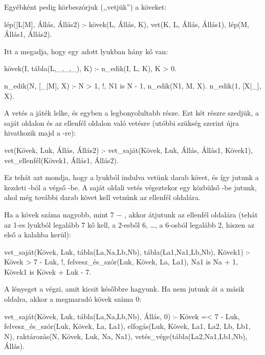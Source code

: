 Egyébként pedig körbeszórjuk (,,vetjük'') a köveket:
\begin{program}
lép([L|M], Állás, Állás2) :-
    kövek(L, Állás, K),
    vet(K, L, Állás, Állás1),
    lép(M, Állás1, Állás2).
\end{program}

Itt a  megadja, hogy egy adott lyukban
hány kő van:
\begin{program}
kövek(I, tábla(L,_,_,_), K) :- n_edik(I, L, K), K > 0.

n_edik(N, [_|M], X) :-
    N > 1, !, N1 is N - 1,
    n_edik(N1, M, X).
n_edik(1, [X|_], X).
\end{program}

A vetés a játék lelke, és egyben a legbonyolultabb
része. Ezt két részre szedjük, a saját oldalon és az
ellenfél oldalon való vetésre (utóbbi szükség
szerint újra hivatkozik majd a -re):
\begin{program}
vet(Kövek, Luk, Állás, Állás2) :-
    vet_saját(Kövek, Luk, Állás, Állás1, Kövek1),
    vet_ellenfél(Kövek1, Állás1, Állás2).
\end{program}

Ez tehát azt mondja, hogy a  lyukból indulva
vetünk  darab követ, és így jutunk a
kezdeti -ból a végső -be. A
saját oldali vetés végeztekor egy közbülső
-be jutunk, ahol még további 
darab követ kell vetnünk az ellenfél oldalára.

Ha a kövek száma nagyobb, mint 7 $-$ , akkor
átjutunk az ellenfél oldalára (tehát az 1-es lyukból
legalább 7 kő kell, a 2-esből 6, \dots, a 6-osból
legalább 2, hiszen az első a kalahba kerül):
\begin{program}
vet_saját(Kövek, Luk, tábla(La,Na,Lb,Nb),
          tábla(La1,Na1,Lb,Nb), Kövek1) :-
    Kövek > 7 - Luk, !, %
    felvesz_és_szór(Luk, Kövek, La, La1),
    Na1 is Na + 1, Kövek1 is Kövek + Luk - 7.
\end{program}

A lényeget a  végzi, amit
kicsit későbbre hagyunk. Ha nem jutunk át a másik
oldalra, akkor a megmaradó kövek száma 0:
\begin{program}
vet_saját(Kövek, Luk,
          tábla(La,Na,Lb,Nb), Állás, 0) :-
    Kövek =< 7 - Luk,
    felvesz_és_szór(Luk, Kövek, La, La1),
    elfogás(Luk, Kövek, La1, La2, Lb, Lb1, N),
    raktározás(N, Kövek, Luk, Na, Na1),
    vetés_vége(tábla(La2,Na1,Lb1,Nb), Állás).
\end{program}

